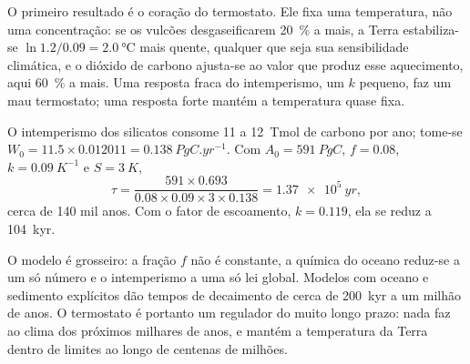 O primeiro resultado é o coração do termostato. Ele fixa uma temperatura, não uma concentração: se
os vulcões desgaseificarem \qty{20}{\percent} a mais, a Terra estabiliza-se $\ln 1.2/0.09 = \qty{2.0}{\celsius}$
mais quente, qualquer que seja sua sensibilidade climática, e o dióxido de carbono ajusta-se ao valor que produz esse
aquecimento, aqui \qty{60}{\percent} a mais. Uma resposta fraca do intemperismo, um $k$ pequeno, faz um mau
termostato; uma resposta forte mantém a temperatura quase fixa.

\begin{example}\label{ex:b2:deep-time-climate:tau}
O intemperismo dos silicatos consome 11 a \qty{12}{Tmol} de carbono por ano; tome-se $W_0 = 11.5\times0.012011
= \qty{0.138}{PgC.yr^{-1}}$. Com $A_0 = \qty{591}{PgC}$, $f = 0.08$, $k = \qty{0.09}{K^{-1}}$ e
$S = \qty{3}{K}$,
\[
  \tau = \frac{591\times0.693}{0.08\times0.09\times3\times0.138} = \qty{1.37e5}{yr} ,
\]
cerca de 140 mil anos. Com o fator de escoamento, $k = 0.119$, ela se reduz a
\qty{104}{kyr}.
\end{example}

O modelo é grosseiro: a fração $f$ não é constante, a química do oceano reduz-se a um só
número e o intemperismo a uma só lei global. Modelos com oceano e sedimento explícitos dão
tempos de decaimento de cerca de \qty{200}{kyr} a um milhão de anos. O termostato é portanto um
regulador do muito longo prazo: nada faz ao clima dos próximos milhares de anos, e
mantém a temperatura da Terra dentro de limites ao longo de centenas de milhões.

